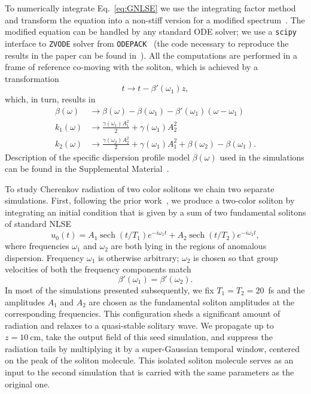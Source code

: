 \documentclass[aps, pra, twocolumn, superscriptaddress, final]{revtex4}
\DeclareMathOperator{\sech}{sech}
\begin{document}
To numerically integrate Eq.~\eqref{eq:GNLSE} we use the integrating factor
method and transform the equation into a non-stiff version for a modified
spectrum~\cite{dudley2010supercontinuum}. The modified equation can be handled
by any standard ODE solver; we use a \texttt{scipy} interface to \texttt{ZVODE}
solver from \texttt{ODEPACK}~\cite{hindmarsh1983odepack, virtanen2020scipy}
(the code necessary to reproduce the results in the paper can be found
in~\cite{sources}). All the computations are performed in a frame of reference
co-moving with the soliton, which is achieved by a transformation
\begin{equation*}
  t \to t - \beta'(\omega_{1}) z,
\end{equation*}
which, in turn, results in
\begin{align*}
  \beta(\omega) &\to
    \beta(\omega)
    - \beta(\omega_{1})
    - \beta'(\omega_{1}) (\omega - \omega_{1}) \\
  k_{1}(\omega) &\to
    \frac{\gamma(\omega_{1}) A_{1}^{2}}{2} + \gamma(\omega_{1}) A_{2}^{2} \\
  k_{2}(\omega) &\to
    \frac{\gamma(\omega_{2}) A_{2}^{2}}{2}
    + \gamma(\omega_{1}) A_{1}^{2}
    + \beta(\omega_{2}) - \beta(\omega_{1}).
\end{align*}
Description of the specific dispersion profile model $\beta(\omega)$ used in the
simulations can be found in the Supplemental Material~\cite{suppMat}.

To study Cherenkov radiation of two color solitons we chain two separate simulations. First, following the prior work~\cite{PhysRevLett.123.243905}, we produce a two-color soliton by integrating an initial condition that is given by a sum of two fundamental solitons of standard NLSE
\begin{equation}
  \label{eq:SeedInitialCondition}
  u_{0}(t) =
      A_{1} \sech(t / T_{1}) e^{-i \omega_{1} t} +
      A_{2} \sech(t / T_{2}) e^{-i \omega_{2} t},
\end{equation}
where frequencies $\omega_{1}$ and $\omega_{2}$ are both lying in the regions of
anomalous dispersion. Frequency $\omega_{1}$ is otherwise arbitrary;
$\omega_{2}$ is chosen so that group velocities of both the frequency components
match
\begin{equation*}
  \beta'(\omega_{1}) = \beta'(\omega_{2}).
\end{equation*}
In most of the simulations presented subsequently, we fix $T_{1} = T_{2} =
20$~fs and the amplitudes $A_{1}$ and $A_{2}$ are chosen as the fundamental
soliton amplitudes at the corresponding frequencies. This configuration sheds a
significant amount of radiation and relaxes to a quasi-stable solitary wave. We
propagate up to $z = 10~\text{cm}$, take the output field of this seed
simulation, and suppress the radiation tails by multiplying it by a
super-Gaussian temporal window, centered on the peak of the soliton molecule.
This isolated soliton molecule serves as an input to the second simulation that is
carried with the same parameters as the original one.
\end{document}
